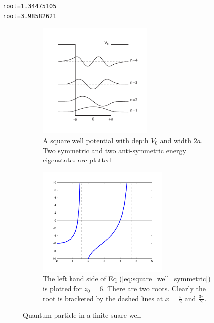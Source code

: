 \begin{center}
\begin{minipage}{0.5\textwidth}
\small
\begin{Verbatim}[frame=single]
root=1.34475105
root=3.98582621
\end{Verbatim}
\normalsize
\end{minipage}
\end{center}

\begin{figure}
\centering
	\begin{subfigure}{0.45\textwidth}
		\centering
		\includegraphics[width=2.2in]{04.root-finding/square_well_energy.pdf}
\caption{A square well potential with depth $V_0$ and width $2a$.  Two symmetric and two anti-symmetric energy eigenstates are plotted.}\label{fig:square_well_energy}
	\end{subfigure}
	\begin{subfigure}{0.45\textwidth}
		\centering
		\includegraphics[width=2.5in]{04.root-finding/square_well_root.pdf}
\caption{The left hand side of Eq (\ref{eq:square_well_symmetric}) is plotted for $z_0=6$. There are two roots. Clearly the root is bracketed by the dashed lines at $x=\frac{\pi}{2}$ and $\frac{3\pi}{2}$.}\label{fig:square_well_root}
	\end{subfigure}
\caption{Quantum particle in a finite suare well}\label{fig:square_well}
\end{figure}

